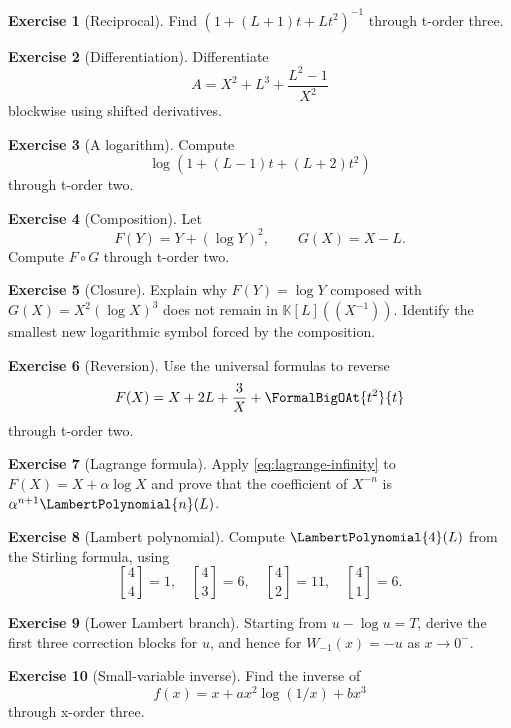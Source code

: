 \documentclass[11pt,openany]{book}
\theoremstyle{definition}
\newtheorem{exercise}{Exercise}[chapter]
\theoremstyle{plain}
\theoremstyle{remark}
\newcommand{\K}{\mathbb{K}}
\newcommand{\stirlingone}[2]{\genfrac{[}{]}{0pt}{}{#1}{#2}}
\newcommand{\compose}{\mathbin{\circ}}
\begin{document}
\begin{exercise}[Reciprocal]
Find \((1+(L+1)t+Lt^2)^{-1}\) through t-order three.
\end{exercise}

\begin{exercise}[Differentiation]
Differentiate
\[
 A=X^2+L^3+\frac{L^2-1}{X^2}
\]
blockwise using shifted derivatives.
\end{exercise}

\begin{exercise}[A logarithm]
Compute
\[
 \log\left(1+(L-1)t+(L+2)t^2\right)
\]
through t-order two.
\end{exercise}

\begin{exercise}[Composition]
Let
\[
 F(Y)=Y+(\log Y)^2,
 \qquad
 G(X)=X-L.
\]
Compute \(F\compose G\) through t-order two.
\end{exercise}

\begin{exercise}[Closure]
Explain why \(F(Y)=\log Y\) composed with
\(G(X)=X^2(\log X)^3\) does not remain in \(\K[L]((X^{-1}))\).
Identify the smallest new logarithmic symbol forced by the composition.
\end{exercise}

\begin{exercise}[Reversion]
Use the universal formulas to reverse
\[
 F(X)=X+2L+\frac3X+\FormalBigOAt{t^2}{t}
\]
through t-order two.
\end{exercise}

\begin{exercise}[Lagrange formula]
Apply \cref{eq:lagrange-infinity} to \(F(X)=X+\alpha\log X\) and prove that the
coefficient of \(X^{-n}\) is \(\alpha^{n+1}\LambertPolynomial{n}(L)\).
\end{exercise}

\begin{exercise}[Lambert polynomial]
Compute \(\LambertPolynomial{4}(L)\) from the Stirling formula, using
\[
 \stirlingone{4}{4}=1,
 \quad \stirlingone{4}{3}=6,
 \quad \stirlingone{4}{2}=11,
 \quad \stirlingone{4}{1}=6.
\]
\end{exercise}

\begin{exercise}[Lower Lambert branch]
Starting from \(u-\log u=T\), derive the first three correction blocks for
\(u\), and hence for \(W_{-1}(x)=-u\) as \(x\to0^-\).
\end{exercise}

\begin{exercise}[Small-variable inverse]
Find the inverse of
\[
 f(x)=x+a x^2\log(1/x)+b x^3
\]
through x-order three.
\end{exercise}
\end{document}
